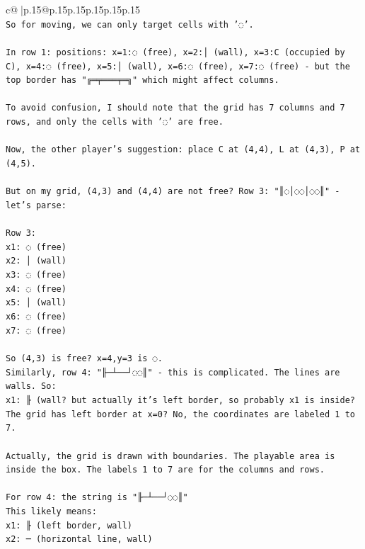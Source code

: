 \documentclass{article}
\begin{document}
{\begin{supertabular}{c@{$\;$}|p{.15\linewidth}@{}p{.15\linewidth}p{.15\linewidth}p{.15\linewidth}p{.15\linewidth}p{.15\linewidth}}
{{{\\ 
\texttt{So for moving, we can only target cells with '◌'.} \\
\\ 
\texttt{In row 1: positions: x=1:◌ (free), x=2:│ (wall), x=3:C (occupied by C), x=4:◌ (free), x=5:│ (wall), x=6:◌ (free), x=7:◌ (free) {-} but the top border has "╔═╤═══╤═╗" which might affect columns.} \\
\\ 
\texttt{To avoid confusion, I should note that the grid has 7 columns and 7 rows, and only the cells with '◌' are free.} \\
\\ 
\texttt{Now, the other player's suggestion: place C at (4,4), L at (4,3), P at (4,5).} \\
\\ 
\texttt{But on my grid, (4,3) and (4,4) are not free? Row 3: "║◌│◌◌│◌◌║" {-} let's parse:} \\
\\ 
\texttt{Row 3: } \\
\texttt{x1: ◌ (free)} \\
\texttt{x2: │ (wall)} \\
\texttt{x3: ◌ (free)} \\
\texttt{x4: ◌ (free)} \\
\texttt{x5: │ (wall)} \\
\texttt{x6: ◌ (free)} \\
\texttt{x7: ◌ (free)} \\
\\ 
\texttt{So (4,3) is free? x=4,y=3 is ◌.} \\
\texttt{Similarly, row 4: "╟─┴──┘◌◌║" {-} this is complicated. The lines are walls. So:} \\
\texttt{x1: ╟ (wall? but actually it's left border, so probably x1 is inside? The grid has left border at x=0? No, the coordinates are labeled 1 to 7.} \\
\\ 
\texttt{Actually, the grid is drawn with boundaries. The playable area is inside the box. The labels 1 to 7 are for the columns and rows.} \\
\\ 
\texttt{For row 4: the string is "╟─┴──┘◌◌║"} \\
\texttt{This likely means:} \\
\texttt{x1: ╟ (left border, wall)} \\
\texttt{x2: ─ (horizontal line, wall)} \\
}}}
\end{supertabular}}
\end{document}
